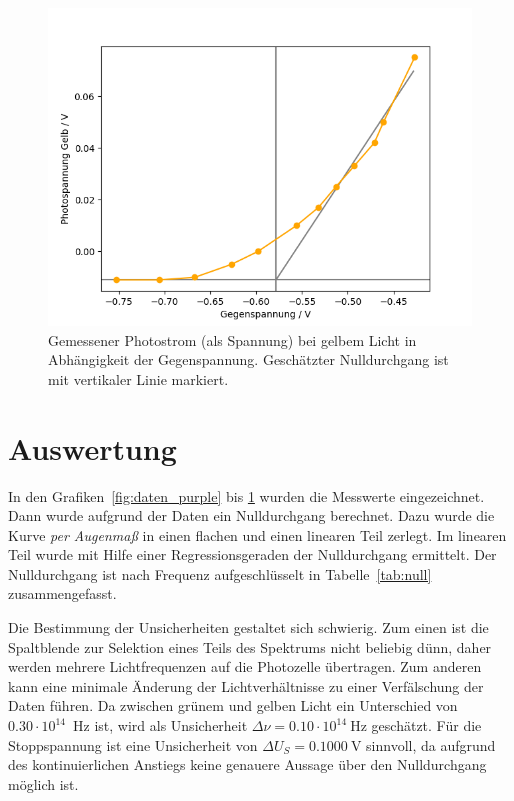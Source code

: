 \documentclass{article}
\begin{document}
\begin{figure}[H]
\includegraphics[scale=0.6]{orange.png}
\caption{Gemessener Photostrom (als Spannung) bei gelbem Licht in Abhängigkeit der Gegenspannung. Geschätzter Nulldurchgang ist mit vertikaler Linie markiert.}
\label{fig:daten_yellow}
\end{figure}
\newpage



\section{Auswertung}

In den Grafiken~\ref{fig:daten_purple} bis \ref{fig:daten_yellow} wurden die Messwerte eingezeichnet. Dann wurde aufgrund der Daten ein Nulldurchgang berechnet. Dazu wurde die Kurve \textit{per Augenmaß} in einen flachen und einen linearen Teil zerlegt. Im linearen Teil wurde mit Hilfe einer Regressionsgeraden der Nulldurchgang ermittelt. Der Nulldurchgang ist nach Frequenz aufgeschlüsselt in Tabelle~\ref{tab:null} zusammengefasst.

Die Bestimmung der Unsicherheiten gestaltet sich schwierig. Zum einen ist die Spaltblende zur Selektion eines Teils des Spektrums nicht beliebig dünn, daher werden mehrere Lichtfrequenzen auf die Photozelle übertragen. Zum anderen kann eine minimale Änderung der Lichtverhältnisse zu einer Verfälschung der Daten führen. Da zwischen grünem und gelben Licht ein Unterschied von $0.30\cdot 10^{14}$~Hz ist, wird als Unsicherheit $\Delta \nu = 0.10\cdot 10^{14}~$Hz geschätzt. Für die Stoppspannung ist eine Unsicherheit von $\Delta U_S = 0.1000~$V sinnvoll, da aufgrund des kontinuierlichen Anstiegs keine genauere Aussage über den Nulldurchgang möglich ist.
\end{document}
